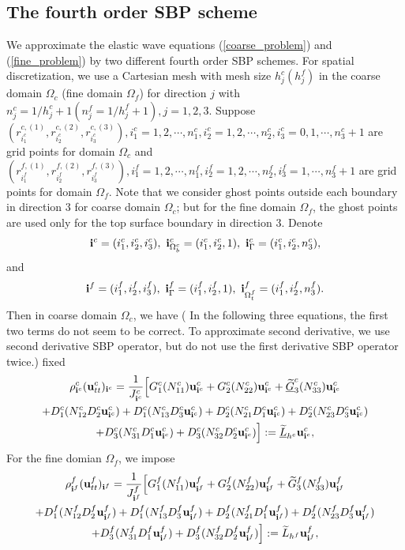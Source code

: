 \documentclass[a4paper]{article}
\newcommand{\wt}{\widetilde}
\begin{document}
\subsection{The fourth order SBP scheme}\label{sub_section_4_1}
We approximate the elastic wave equations (\ref{coarse_problem}) and (\ref{fine_problem}) by two different fourth order SBP schemes. For spatial discretization, we use a Cartesian mesh with mesh size $h_j^c (h_j^f)$ in the coarse domain $\Omega_c$ (fine domain $\Omega_f$) for direction $j$ with $n_j^c = 1/h_j^c +1 (n_j^f = 1/h_j^f +1), j = 1,2,3$. Suppose $(r^{c,(1)}_{i_1^c}, r^{c,(2)}_{i_2^c}, r^{c,(3)}_{i_3^c}), i_1^c = 1,2,\cdots,n_1^c, i_2^c = 1,2,\cdots,n_2^c,i_3^c=0,1,\cdots,n_3^c+1$ are grid points for domain $\Omega_c$ and   $(r^{f,(1)}_{i_1^f}, r^{f,(2)}_{i_2^f}, r^{f,(3)}_{i_3^f}), i_1^f = 1,2,\cdots,n_1^f, i_2^f = 1,2,\cdots,n_2^f,i_3^f=1,\cdots,n_3^f+1$ are grid points for domain $\Omega_f$. Note that we consider ghost points outside each boundary in direction $3$ for coarse domain $\Omega_c$; but for the fine domain $\Omega_f$, the ghost points are used only for the top surface boundary in direction $3$. Denote 
\[{\bf i}^c = (i_1^c,i_2^c,i_3^c), \ {\bf i}^c_{\Omega^c_b} = (i_1^c,i_2^c,1),\  {\bf i}^c_{\Gamma} = (i_1^c,i_2^c,n_3^c),\]
and
\[ {\bf i}^f = (i_1^f,i_2^f,i_3^f), \ {\bf i}^f_{\Gamma} = (i_1^f,i_2^f,1), \ {\bf i}^f_{\Omega_t^f} = (i_1^f,i_2^f,n_3^f).\]
 Then in coarse domain $\Omega_c$, we have {(\color{red} In the following three equations, the first two terms do not seem to be correct. To approximate second derivative, we use second derivative SBP operator, but do not use the first derivative SBP operator twice.)}{\color{blue} fixed}
\begin{multline}\label{coarse_scheme}
\rho_{{\bf i}^c}^c ({\bf u}_{tt}^c)_{{\bf i}^c} = \frac{1}{J_{{\bf i}^c}^c}\Big[G_1^c(N_{11}^c){\bf u}_{{\bf i}^c}^c+G_2^c(N_{22}^c){\bf u}_{{\bf i}^c}^c+\uline{\wt{G}}_3^c(N_{33}^c){\bf u}_{{\bf i}^c}^c\\
+D_1^c(N_{12}^cD_2^c{\bf u}_{{\bf i}^c}^c)+D_1^c(N_{13}^cD_3^c{\bf u}_{{\bf i}^c}^c)
+D_2^c(N_{21}^cD_1^c{\bf u}_{{\bf i}^c}^c)+D_2^c(N_{23}^cD_3^c{\bf u}_{{\bf i}^c}^c)\\
+D_3^c(N_{31}^cD_1^c{\bf u}_{{\bf i}^c}^c)
+D_3^c(N_{32}^cD_2^c{\bf u}_{{\bf i}^c}^c)\Big] := \uline{\wt{L}}_{h^c} {\bf{u}}^c_{{\bf i}^c},
\end{multline}
 For the fine domian $\Omega_f$, we impose
\begin{multline}\label{fine_scheme_2}
\rho_{{\bf i}^f}^f ({\bf u}_{tt}^f)_{{\bf i}^f} =
 \frac{1}{J_{{\bf i}^f}^f}\Big[G_1^f(N_{11}^f){\bf u}_{{\bf i}^f}^f+G_2^f(N_{22}^f){\bf u}_{{\bf i}^f}^f+\wt{G}_3^f(N_{33}^f){\bf u}_{{\bf i}^f}^f\\
+D_1^f(N_{12}^fD_2^f{\bf u}_{{\bf i}^f}^f)+D_1^f(N_{13}^fD_3^f{\bf u}_{{\bf i}^f}^f)
+D_2^f(N_{21}^fD_1^f{\bf u}_{{\bf i}^f}^f)+D_2^f(N_{23}^fD_3^f{\bf u}_{{\bf i}^f}^f)\\
+D_3^f(N_{31}^fD_1^f{\bf u}_{{\bf i}^f}^f)+D_3^f(N_{32}^fD_2^f{\bf u}_{{\bf i}^f}^f)\Big] 
:= \wt{L}_{h^f}{\bf{u}}^f_{{\bf i}^f},
\end{multline}
\end{document}
